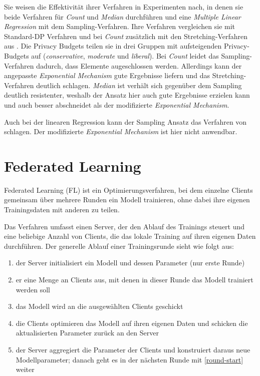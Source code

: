 Sie weisen die Effektivität ihrer Verfahren in Experimenten nach, in denen sie beide Verfahren für \textit{Count} und \textit{Median} durchführen und eine \textit{Multiple Linear Regression} mit dem Sampling-Verfahren. Ihre Verfahren vergleichen sie mit Standard-DP Verfahren und bei \textit{Count} zusätzlich mit den Stretching-Verfahren aus \cite{alaggan:2016}. Die Privacy Budgets teilen sie in drei Gruppen mit aufsteigenden Privacy-Budgets auf (\textit{conservative}, \textit{moderate} und \textit{liberal}). Bei \textit{Count} leidet das Sampling-Verfahren dadurch, dass Elemente augeschlossen werden. Allerdings kann der angepasste \textit{Exponential Mechanism} gute Ergebnisse liefern und das Stretching-Verfahren deutlich schlagen. \textit{Median} ist verhält sich gegenüber dem Sampling deutlich resistenter, weshalb der Ansatz hier auch gute Ergebnisse erzielen kann und auch besser abschneidet als der modifizierte \textit{Exponential Mechanism}. 

Auch bei der linearen Regression kann der Sampling Ansatz das Verfahren von \cite{alaggan:2016} schlagen. Der modifizierte \textit{Exponential Mechanism} ist hier nicht anwendbar.

\section{Federated Learning}

Federated Learning (FL) ist ein Optimierungsverfahren, bei dem einzelne Clients gemeinsam über mehrere Runden ein Modell trainieren, ohne dabei ihre eigenen Trainingsdaten mit anderen zu teilen. 

Das Verfahren umfasst einen Server, der den Ablauf des Trainings steuert und eine beliebige Anzahl von Clients, die das lokale Training auf ihren eigenen Daten durchführen. Der generelle Ablauf einer Trainingsrunde sieht wie folgt aus: 

\begin{enumerate}
	\item der Server initialisiert ein Modell und dessen Parameter (nur erste Runde) 
	\item \label{round-start} er eine Menge an Clients aus, mit denen in dieser Runde das Modell trainiert werden soll
	\item das Modell wird an die ausgewählten Clients geschickt
	\item die Clients optimieren das Modell auf ihren eigenen Daten und schicken die aktualisierten Parameter zurück an den Server
	\item der Server aggregiert die Parameter der Clients und konstruiert daraus neue Modellparameter; danach geht es in der nächsten Runde mit \autoref{round-start} weiter
\end{enumerate}

